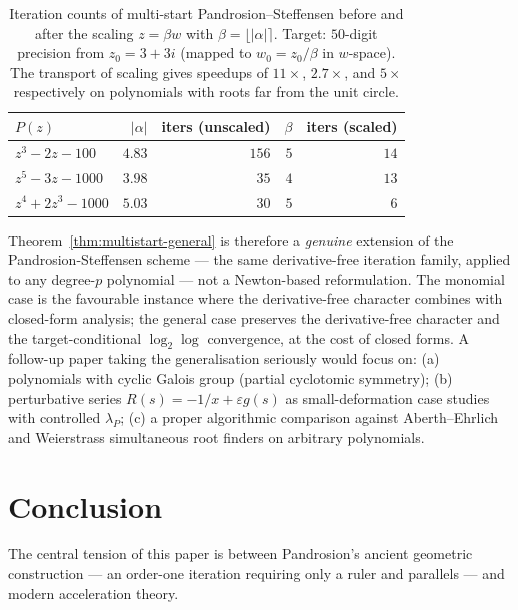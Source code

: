 \documentclass[11pt,a4paper]{article}
\theoremstyle{definition}
\begin{document}
\begin{enumerate}
  \begin{table}[H]
  \centering
  \begin{tabular}{lrrrr}
    \toprule
    $P(z)$ & $|\alpha|$ & iters (unscaled) & $\beta$ & iters (scaled) \\
    \midrule
    $z^3 - 2z - 100$    & $4.83$ & $156$ & $5$  & $14$ \\
    $z^5 - 3z - 1000$   & $3.98$ & $35$  & $4$  & $13$ \\
    $z^4 + 2z^3 - 1000$ & $5.03$ & $30$  & $5$  & $6$  \\
    \bottomrule
  \end{tabular}
  \caption{Iteration counts of multi-start Pandrosion--Steffensen before and after the scaling $z = \beta w$ with $\beta = \lfloor|\alpha|\rceil$. Target: $50$-digit precision from $z_0 = 3 + 3i$ (mapped to $w_0 = z_0/\beta$ in $w$-space). The transport of scaling gives speedups of $11\times$, $2.7\times$, and $5\times$ respectively on polynomials with roots far from the unit circle.}
  \label{tab:scaling-general}
  \end{table}
\end{enumerate}

Theorem~\ref{thm:multistart-general} is therefore a \emph{genuine} extension of the Pandrosion-Steffensen scheme --- the same derivative-free iteration family, applied to any degree-$p$ polynomial --- not a Newton-based reformulation. The monomial case is the favourable instance where the derivative-free character combines with closed-form analysis; the general case preserves the derivative-free character and the target-conditional $\log_2\log$ convergence, at the cost of closed forms. A follow-up paper taking the generalisation seriously would focus on: (a) polynomials with cyclic Galois group (partial cyclotomic symmetry); (b) perturbative series $R(s) = -1/x + \varepsilon g(s)$ as small-deformation case studies with controlled $\lambda_P$; (c) a proper algorithmic comparison against Aberth--Ehrlich and Weierstrass simultaneous root finders on arbitrary polynomials.

\section{Conclusion}
\label{sec:conclusion}

The central tension of this paper is between Pandrosion's ancient geometric construction --- an order-one iteration requiring only a ruler and parallels --- and modern acceleration theory.
\end{document}
